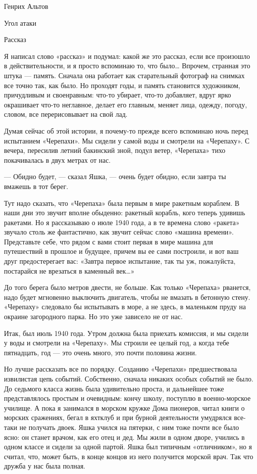 
Генрих Альтов

Угол атаки


Рассказ

Я написал  слово «рассказ»  и  подумал: какой  же  это рассказ,  если  все
произошло в действительности, и я просто вспоминаю то, что было…  Впрочем,
странная это  штука  —  память.  Сначала  она  работает  как  старательный
фотограф на снимках все  точно так, как было.  Но проходят годы, и  память
становится художником, причудливым и  своенравным: что-то убирает,  что-то
добавляет, вдруг  ярко окрашивает  что-то неглавное,  делает его  главным,
меняет лица, одежду, погоду, словом, все перерисовывает на свой лад.

Думая сейчас  об этой  истории, я  почему-то прежде  всего вспоминаю  ночь
перед испытанием  «Черепахи».  Мы  сидели  у  самой  воды  и  смотрели  на
«Черепаху». С  вечера,  пересилив  летний  бакинский  зной,  подул  ветер,
«Черепаха» тихо покачивалась в двух метрах от нас.

— Обидно  будет, —  сказал Яшка,  —  очень будет  обидно, если  завтра  ты
вмажешь в тот берег.

Тут надо сказать, что «Черепаха» была  первым в мире ракетным кораблем.  В
наши дни это звучит вполне обыденно: ракетный корабль, кого теперь удивишь
ракетами. Но я рассказываю о июле 1940 года, а в те времена слово «ракета»
звучало столь же  фантастично, как звучит  сейчас слово «машина  времени».
Представьте себе,  что  рядом  с  вами стоит  первая  в  мире  машина  для
путешествий в прошлое и  будущее, причем вы ее  сами построили, и вот  ваш
друг предостерегает вас: «Завтра первое испытание, так ты уж,  пожалуйста,
постарайся не врезаться в каменный век…»

До того  берега  было метров  двести,  не больше.  Как  только  «Черепаха»
рванется, надо будет  мгновенно выключить  двигатель, чтобы  не вмазать  в
бетонную стену. «Черепаху» следовало бы испытывать  в море, а не здесь,  в
маленьком пруду на окраине  загородного парка. Но это  уже зависело не  от
нас.

Итак, был июль 1940 года. Утром должна была приехать комиссия, и мы сидели
у воды и смотрели  на «Черепаху». Мы  строили ее целый  год, а когда  тебе
пятнадцать, год — это очень много, это почти половина жизни.

Но лучше рассказать все по порядку. Созданию «Черепахи» предшествовала
извилистая цепь событий. Собственно, сначала никаких особых событий не
было. До седьмого  класса жизнь была удивительно  проста, и дальнейшее
тоже  представлялось  простым и  очевидным:  кончу  школу, поступлю  в
военно-морское  училище. А  пока  я занимался  в  морском кружке  Дома
пионеров,  читал книги  о морских  сражениях,  бегал в  яхтклуб и  при
бурной деятельности умудрялся все-таки  не получать двоек. Яшка учился
на пятерки, с ним тоже почти все  было ясно: он станет врачом, как его
отец и дед. Мы жили в одном  дворе, учились в одном классе и сидели за
одной партой. Яшка был типичным  «отличником», но я считал, что, может
быть, в конце концов из него  получится морской врач. Так что дружба у
нас была полная.

